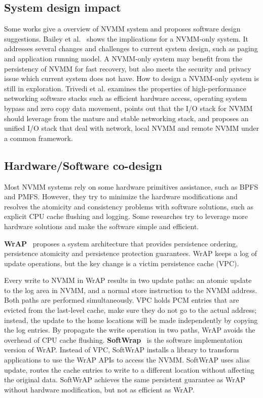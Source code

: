 \subsection{System design impact} 
\label{sec:systemdesign}

Some works give a overview of NVMM system and proposes software
design suggestions.
Bailey et al.~\cite{systemimplications} shows the implications for a NVMM-only
system. It addresses several changes and challenges to current system design,
such as paging and application running model. A NVMM-only system may benefit
from the persistency of NVMM for fast recovery, but also meets the security
and privacy issue which current system does not have. How to design a
NVMM-only system is still in exploration. Trivedi et al.\cite{onestack}
 examines the
properties of high-performance networking software stacks such as efficient
hardware access, operating system bypass and zero copy data movement,
points out that the I/O stack for NVMM should leverage from the mature and
stable networking stack, and proposes an unified I/O stack that deal with
network, local NVMM and remote NVMM under a common framework.


\subsection{Hardware/Software co-design} 
\label{sec:hwswdesign}

Most NVMM systems rely on some hardware primitives assistance, 
such as BPFS and PMFS.
However, they try to minimize the hardware modifications and resolves the
atomicity and consistency problems with software solutions,
such as explicit CPU cache flushing and logging.
Some researches try to leverage more hardware
solutions and make the software simple and efficient.

\textbf{WrAP}~\cite{WrAP} proposes a system architecture
 that provides persistence
ordering, persistence atomicity and persistence protection guarantees. 
WrAP keeps a log of update operations, but the key change is 
a victim persistence cache (VPC).

Every write to NVMM in WrAP results in two update paths: an atomic update to
the log area in NVMM, and a normal store instruction to the NVMM address. Both
paths are performed simultaneously. VPC holds PCM entries that are evicted
from the last-level cache, make sure they do not go to the actual address;
instead, the update to the home locations will be made
independently by copying the log entries.
By propagate the write operation in two paths, WrAP avoids the overhead of CPU
cache flushing.
\textbf{SoftWrap}~\cite{softWrAP}
 is the software implementation version of WrAP.
Instead of VPC, SoftWrAP installs a library
to transform applications to use the WrAP APIs to access the NVMM.
SoftWrAP
uses alias update, routes the cache entries to write to a different location
without affecting the original data. SoftWrAP achieves the same persistent
guarantee as WrAP without hardware modification, but not as efficient as WrAP.

